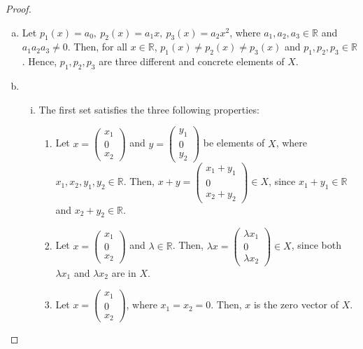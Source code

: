 \begin{proof}
\begin{enumerate}[(a)]
    \item Let $p_1(x) = a_0,\:p_2(x) = a_1x,\:p_3(x) = a_2x^2$, where $a_1, a_2, a_3\in\mathbb{R}$ and $a_1a_2a_3 \not=0$. Then, for all $x\in\mathbb{R}$, $p_1(x)\not=p_2(x)\not=p_3(x)$ and $p_1, p_2, p_3\in\mathbb{R}$. Hence, $p_1, p_2, p_3$ are three different and concrete elements of $X$.
    
    \item\begin{enumerate}[(i)]
        \item The first set satisfies the three following properties:
        \begin{enumerate}[(1)]
            \item Let $x = \begin{pmatrix}x_1\\0\\x_2\end{pmatrix}$ and $y = \begin{pmatrix}y_1\\0\\y_2\end{pmatrix}$ be elements of $X$, where $x_1, x_2, y_1, y_2\in\mathbb{R}$. Then, $x+y=\begin{pmatrix}x_1+y_1\\0\\x_2+y_2\end{pmatrix}\in X$, since $x_1 + y_1\in\mathbb{R}$ and $x_2 + y_2\in\mathbb{R}$.
            \item Let $x = \begin{pmatrix}x_1\\0\\x_2\end{pmatrix}$ and $\lambda\in\mathbb{R}$. Then, $\lambda x = \begin{pmatrix}\lambda x_1\\0\\\lambda x_2\end{pmatrix}\in X$, since both $\lambda x_1$ and $\lambda x_2$ are in $X$.
            \item Let $x = \begin{pmatrix}x_1\\0\\x_2\end{pmatrix}$, where $x_1 = x_2 = 0$. Then, $x$ is the zero vector of $X$.
        \end{enumerate}

\end{enumerate}
\end{enumerate}
\end{proof}
